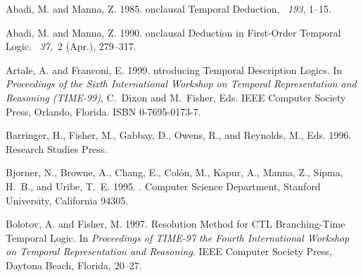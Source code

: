 \documentclass[nohyperref]{acmtrans2f}
\begin{document}
% 
% 
\begin{thebibliography}{}

{\sc Abadi, M.} {\sc and} {\sc Manna, Z.} 1985.
onclausal {T}emporal {D}eduction.
~{\em 193}, 1--15.

{\sc Abadi, M.} {\sc and} {\sc Manna, Z.} 1990.
onclausal {D}eduction in {F}irst-{O}rder {T}emporal {L}ogic.
~{\em 37,\/}~2 (Apr.), 279--317.

{\sc Artale, A.} {\sc and} {\sc Franconi, E.} 1999.
ntroducing {T}emporal {D}escription {L}ogics.
\newblock In {\em Proceedings of the Sixth International Workshop on Temporal
  Representation and Reasoning (TIME-99)}, {C.~Dixon} {and} {M.~Fisher}, Eds.
  IEEE Computer Society Press, Orlando, Florida.
\newblock ISBN 0-7695-0173-7.

{\sc Barringer, H.}, {\sc Fisher, M.}, {\sc Gabbay, D.}, {\sc Owens, R.}, {\sc
  and} {\sc Reynolds, M.}, Eds. 1996.
\newblock Research Studies Press.

{\sc Bjorner, N.}, {\sc Browne, A.}, {\sc Chang, E.}, {\sc Col{\' o}n, M.},
  {\sc Kapur, A.}, {\sc Manna, Z.}, {\sc Sipma, H.~B.}, {\sc and} {\sc Uribe,
  T.~E.} 1995.
.
\newblock Computer Science Department, Stanford University, California 94305.

{\sc Bolotov, A.} {\sc and} {\sc Fisher, M.} 1997.
 {R}esolution {M}ethod for {CTL} {B}ranching-{T}ime {T}emporal
  {L}ogic.
\newblock In {\em Proceedings of TIME-97 the Fourth International Workshop on
  Temporal Representation and Reasoning}. IEEE Computer Society Press, Daytona
  Beach, Florida, 20--27.


\end{thebibliography}
\end{document}
